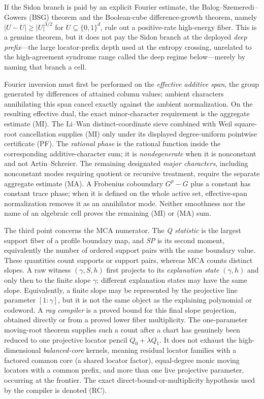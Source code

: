 \documentclass[12pt,a4paper]{amsart}
\numberwithin{equation}{section}
\theoremstyle{remark}
\newcommand{\abs}[1]{\lvert #1\rvert}
\begin{document}
If the Sidon branch is paid by an explicit Fourier
estimate, the Balog--Szemeredi--Gowers (BSG) theorem and the Boolean-cube
difference-growth theorem, namely
\(\abs{U-U}\ge\abs U^{3/2}\) for \(U\subseteq\{0,1\}^d\), rule out a
positive-rate high-energy fiber.  This is a genuine theorem, but it does
not pay the Sidon branch at the deployed \emph{deep prefix}---the large
locator-prefix depth used at the entropy crossing, unrelated to the
high-agreement syndrome range called the deep regime below---merely by
naming that branch a cell.

Fourier inversion must first be performed on the \emph{effective additive
span}, the group generated by differences of attained column values;
ambient characters annihilating this span cancel exactly against the
ambient normalization.  On the resulting effective dual, the exact
minor-character requirement is the aggregate estimate \textup{(MI)}.
The Li--Wan distinct-coordinate sieve combined with Weil square-root
cancellation \cite{LiWanSieve,LiWanSubset,Weil} supplies \textup{(MI)} only under its displayed
degree-uniform pointwise certificate \textup{(PF)}.  The \emph{rational
phase} is the rational function inside the corresponding
additive-character sum; it is \emph{nondegenerate} when it is nonconstant
and not Artin--Schreier.  The remaining designated \emph{major
characters}, including nonconstant modes requiring quotient or recursive
treatment, require the separate aggregate estimate \textup{(MA)}.  A
Frobenius coboundary \(G^p-G\) plus a constant has constant trace phase;
when it is defined on the whole active set, effective-span normalization
removes it as an annihilator mode.  Neither smoothness nor the name of an
algebraic cell proves the remaining \textup{(MI)} or \textup{(MA)} sum.

The third point concerns the MCA numerator.  The \emph{Q statistic} is the
largest support fiber of a profile boundary map, and \emph{SP} is its
second moment, equivalently the number of ordered support pairs with the
same boundary value.  These quantities count supports or support pairs,
whereas MCA counts distinct slopes.  A raw witness
\((\gamma,S,h)\) first projects to its \emph{explanation state}
\((\gamma,h)\) and only then to the finite slope \(\gamma\); different
explanation states may have the same slope.  Equivalently, a finite slope
may be represented by the projective line parameter \([1:\gamma]\), but
it is not the same object as the explaining polynomial or codeword.  A
\emph{ray compiler} is a proved bound for this final slope projection,
obtained directly or from a proved lower fiber multiplicity.  The
one-parameter moving-root
theorem supplies such a count after a chart has genuinely been reduced to
one projective locator pencil \(Q_0+\lambda Q_1\).  It does not exhaust the high-dimensional
\emph{balanced-core} kernels, meaning residual locator families with a
factored common core (a shared locator factor), equal-degree monic moving locators with a common
prefix, and more than one live projective parameter, occurring
at the frontier.  The exact direct-bound-or-multiplicity hypothesis used by
the compiler is denoted \textup{(RC)}.
\end{document}
